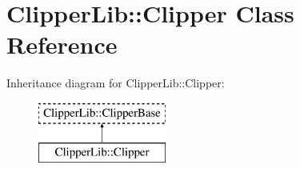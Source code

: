 \hypertarget{class_clipper_lib_1_1_clipper}{}\section{Clipper\+Lib\+:\+:Clipper Class Reference}
\label{class_clipper_lib_1_1_clipper}
Inheritance diagram for Clipper\+Lib\+:\+:Clipper\+:\begin{figure}[H]
\begin{center}
\leavevmode
\includegraphics[height=2.000000cm]{class_clipper_lib_1_1_clipper}
\end{center}
\end{figure}
